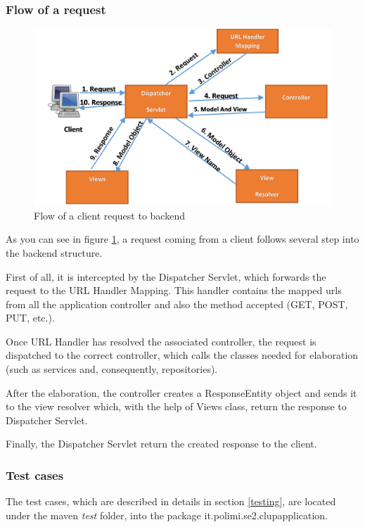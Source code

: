 \documentclass[table, 12pt]{article}
\begin{document}
\subsubsection{Flow of a request}
\begin{figure}[H]
    \includegraphics[width=\textwidth]{assets/Spring-MVC-Flow-Diagram.jpg}
    \caption{Flow of a client request to backend}
    \label{spring_mvc_request}
\end{figure}
As you can see in figure \ref{spring_mvc_request}, a request coming from a client follows several step into the backend structure.

First of all, it is intercepted by the Dispatcher Servlet, which forwards the request to the URL Handler Mapping. This handler contains the mapped urls from all the application controller and also the method accepted (GET, POST, PUT, etc.).

Once URL Handler has resolved the associated controller, the request is dispatched to the correct controller, which calls the classes needed for elaboration (such as services and, consequently, repositories).

After the elaboration, the controller creates a ResponseEntity object and sends it to the view resolver which, with the help of Views class, return the response to Dispatcher Servlet.

Finally, the Dispatcher Servlet return the created response to the client.

\subsubsection{Test cases}
The test cases, which are described in details in section \ref{testing}, are located under the maven \textit{test} folder, into the package it.polimi.se2.clupapplication.
\end{document}
